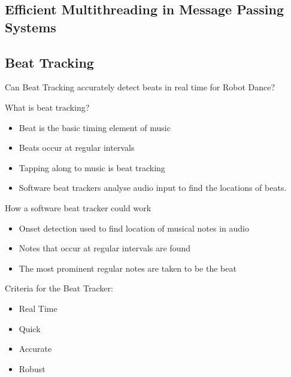 \documentclass{beamer}
\begin{document}
	\subsection{Efficient Multithreading in Message Passing Systems}
	\begin{frame}
		\subsectionpage
	\end{frame}
	
	\subsection{Beat Tracking}
	\begin{frame}
		\subsectionpage
	\end{frame}
	\begin{frame}
		Can Beat Tracking accurately detect beats in real time for Robot Dance?
	\end{frame}
	\begin{frame}
		What is beat tracking?
		\begin{itemize}
			\item Beat is the basic timing element of music
			\item Beats occur at regular intervals
			\item Tapping along to music is beat tracking
			\item Software beat trackers analyse audio input to find the locations of beats.
		\end{itemize}
	\end{frame}
	\begin{frame}
		How a software beat tracker could work
		\begin{itemize}
			\item Onset detection used to find location of musical notes in audio
			\item Notes that occur at regular intervals are found
			\item The most prominent regular notes are taken to be the beat
		\end{itemize}
	\end{frame}
	\begin{frame}
		Criteria for the Beat Tracker:
		\begin{itemize}
			\item Real Time %
			\item Quick %
			\item Accurate %
			\item Robust	%
		\end{itemize}
	\end{frame}
\end{document}
